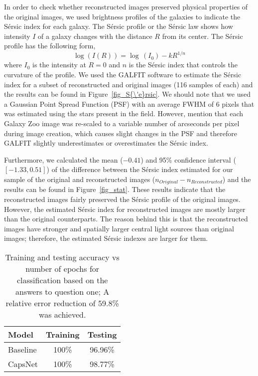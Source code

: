 \documentclass[a4paper,fleqn,usenatbib]{mnras}
\begin{document}
In order to check whether reconstructed images preserved physical properties of the original images, we used brightness profiles of the galaxies to indicate the S{\'e}rsic index \citep{Sersic1963influence} for each galaxy. The S{\'e}rsic profile or the S{\'e}rsic law shows how intensity $I$ of a galaxy changes with the distance $R$ from its center. The S{\'e}rsic profile has the following form,
\begin{equation}
\log(I(R)) = \log\,(I_{0}) - kR^{1/n}
\end{equation}
where $I_{0}$ is the intensity at $R=0$ and $n$ is the S{\'e}rsic index that controls the curvature of the profile. We used the GALFIT software \citep{peng2002detailed} to estimate the S{\'e}rsic index for a subset of reconstructed and original images (116 samples of each) and the results can be found in Figure~\ref{fig_S{\'e}rsic}. We should note that we used a Gaussian Point Spread Function (PSF) with an average FWHM of 6 pixels that was estimated using the stars present in the field. However, \cite{willett2013galaxy} mention that each Galaxy Zoo image was re-scaled to a variable number of arcseconds per pixel during image creation, which causes slight changes in the PSF and therefore GALFIT slightly underestimates or overestimates the S{\'e}rsic index. 

Furthermore, we calculated the mean ($-0.41$) and 95\% confidence interval ($[-1.33, 0.51]$) of the difference between the S{\'e}rsic index estimated for our sample of the original and reconstructed images ($n_{Original} - n_{Reconstructed}$) and the results can be found in Figure~\ref{fig_stat}. These results indicate that the reconstructed images fairly preserved the S{\'e}rsic profile of the original images. However, the estimated S{\'e}rsic index for reconstructed images are mostly larger than the original counterparts. The reason behind this is that the reconstructed images have stronger and spatially larger central light sources than original images; therefore, the estimated S{\'e}rsic indexes are larger for them.

\begin{table}
\centering
 \begin{tabular}{lcc}
  \hline
  Model & Training  & Testing\\
  \hline
  Baseline  & 100\% & 96.96\%\\
 CapsNet &  100\% & 98.77\%\\
  \hline
 \end{tabular}
 \caption{Training and testing accuracy vs number of epochs for classification based on the answers to question one; A relative error reduction of 59.8\% was achieved.}
  \label{ACC_Tab}
\end{table}
\end{document}
